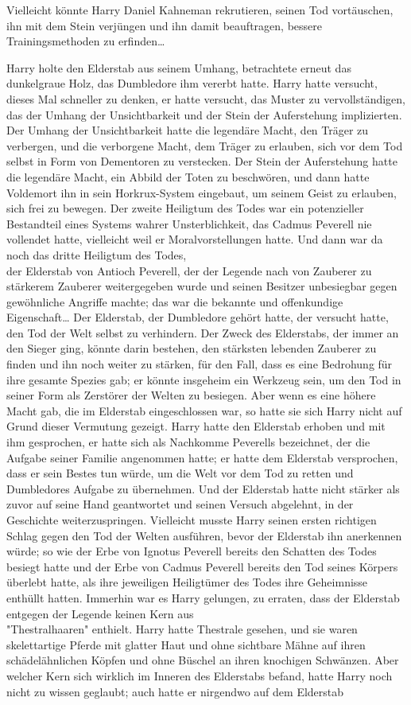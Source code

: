 {Vielleicht könnte Harry Daniel Kahneman rekrutieren, seinen Tod vortäuschen, ihn mit dem Stein verjüngen und ihn damit beauftragen, bessere Trainingsmethoden zu erfinden…

Harry holte den Elderstab aus seinem Umhang, betrachtete erneut das dunkelgraue Holz, das Dumbledore ihm vererbt hatte. Harry hatte versucht, dieses Mal schneller zu denken, er hatte versucht, das Muster zu vervollständigen, das der Umhang der Unsichtbarkeit und der Stein der Auferstehung implizierten. Der Umhang der Unsichtbarkeit hatte die legendäre Macht, den Träger zu verbergen, und die verborgene Macht, dem Träger zu erlauben, sich vor dem Tod selbst in Form von Dementoren zu verstecken. Der Stein der Auferstehung hatte die legendäre Macht, ein Abbild der Toten zu beschwören, und dann hatte Voldemort ihn in sein Horkrux-System eingebaut, um seinem Geist zu erlauben, sich frei zu bewegen. Der zweite Heiligtum des Todes war ein potenzieller Bestandteil eines Systems wahrer Unsterblichkeit, das Cadmus Peverell nie vollendet hatte, vielleicht weil er Moralvorstellungen hatte. Und dann war da noch das dritte Heiligtum des Todes,\\ der Elderstab von Antioch Peverell, der der Legende nach von Zauberer zu stärkerem Zauberer weitergegeben wurde und seinen Besitzer unbesiegbar gegen gewöhnliche Angriffe machte; das war die bekannte und offenkundige Eigenschaft… Der Elderstab, der Dumbledore gehört hatte, der versucht hatte, den Tod der Welt selbst zu verhindern. Der Zweck des Elderstabs, der immer an den Sieger ging, könnte darin bestehen, den stärksten lebenden Zauberer zu finden und ihn noch weiter zu stärken, für den Fall, dass es eine Bedrohung für ihre gesamte Spezies gab; er könnte insgeheim ein Werkzeug sein, um den Tod in seiner Form als Zerstörer der Welten zu besiegen. Aber wenn es eine höhere Macht gab, die im Elderstab eingeschlossen war, so hatte sie sich Harry nicht auf Grund dieser Vermutung gezeigt. Harry hatte den Elderstab erhoben und mit ihm gesprochen, er hatte sich als Nachkomme Peverells bezeichnet, der die Aufgabe seiner Familie angenommen hatte; er hatte dem Elderstab versprochen, dass er sein Bestes tun würde, um die Welt vor dem Tod zu retten und Dumbledores Aufgabe zu übernehmen. Und der Elderstab hatte nicht stärker als zuvor auf seine Hand geantwortet und seinen Versuch abgelehnt, in der Geschichte weiterzuspringen. Vielleicht musste Harry seinen ersten richtigen Schlag gegen den Tod der Welten ausführen, bevor der Elderstab ihn anerkennen würde; so wie der Erbe von Ignotus Peverell bereits den Schatten des Todes besiegt hatte und der Erbe von Cadmus Peverell bereits den Tod seines Körpers überlebt hatte, als ihre jeweiligen Heiligtümer des Todes ihre Geheimnisse enthüllt hatten. Immerhin war es Harry gelungen, zu erraten, dass der Elderstab entgegen der Legende keinen Kern aus\\ "Thestralhaaren" enthielt. Harry hatte Thestrale gesehen, und sie waren skelettartige Pferde mit glatter Haut und ohne sichtbare Mähne auf ihren schädelähnlichen Köpfen und ohne Büschel an ihren knochigen Schwänzen. Aber welcher Kern sich wirklich im Inneren des Elderstabs befand, hatte Harry noch nicht zu wissen geglaubt; auch hatte er nirgendwo auf dem Elderstab }
